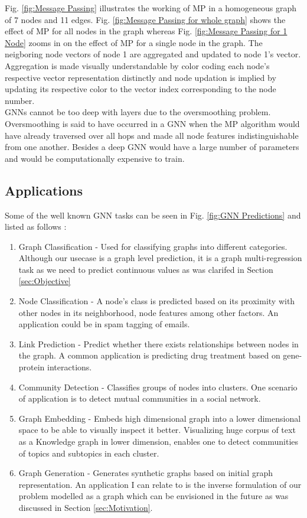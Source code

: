 \documentclass{report} %
\begin{document}
Fig. \ref{fig:Message Passing} illustrates the working of \ac{MP} in a homogeneous graph of 7 nodes and 11 edges. Fig. \ref{fig:Message Passing for whole graph} shows 
the effect of \ac{MP} for all nodes in the graph  whereas Fig. \ref{fig:Message Passing for 1 Node} zooms in on the effect of \ac{MP} for a single node in the graph.
The neigboring node vectors of node 1 are aggregated and updated to node 1's vector. Aggregation is made visually understandable by color coding each node's respective 
vector representation distinctly and node updation is implied by updating its respective color to the vector index corresponding to the node number. \\

\ac{GNN}s cannot be too deep with layers due to the oversmoothing problem. 
Oversmoothing is said to have occurred in a \ac{GNN} when the \ac{MP} algorithm would have already traversed over all hops and made all node features indistinguishable 
from one another. Besides a deep \ac{GNN} would have a large number of parameters and would be computationally expensive to train.

\subsection{Applications}\label{subsec:Applications}

Some of the well known \ac{GNN} tasks can be seen in Fig. \ref{fig:GNN Predictions} and listed as follows :
\begin{enumerate}
    \item Graph Classification - Used for classifying graphs into different categories. Although our usecase is a graph level prediction, it is a graph multi-regression 
    task as we need to predict continuous values as was clarifed in Section \ref{sec:Objective}
    \item Node Classification - A node's class is predicted based on its proximity with other nodes in its neighborhood, node features among other factors. An application could be in 
    spam tagging of emails.
    \item Link Prediction - Predict whether there exists relationships between nodes in the graph. A common application is predicting drug treatment based on gene-protein interactions.
    \item Community Detection - Classifies groups of nodes into clusters. One scenario of application is to detect mutual communities in a social network.
    \item Graph Embedding - Embeds high dimensional graph into a lower dimensional space to be able to visually inspect it better. Visualizing huge corpus of text as a 
    Knowledge graph in lower dimension, enables one to detect communities of topics and subtopics in each cluster.
    \item Graph Generation - Generates synthetic graphs based on initial graph representation. An application I can relate to is the inverse formulation of our problem 
    modelled as a graph which can be envisioned in the future as was discussed in Section \ref{sec:Motivation}.
\end{enumerate}
\end{document}
